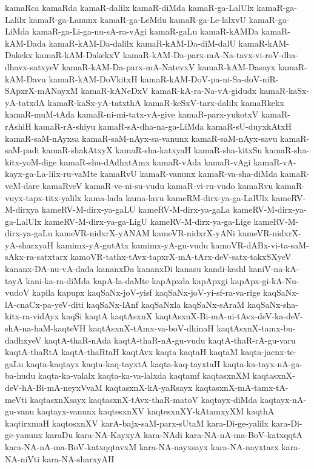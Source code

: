 {kamaRca
kamaRda
kamaR-dalilx
kamaR-diMda
kamaR-ga-LalUlx
kamaR-ga-Lalilx
kamaR-ga-Lanunx
kamaR-ga-LeMdu
kamaR-ga-Le-lalxvU
kamaR-ga-LiMda
kamaR-ga-Li-ga-nu-sA-ra-vAgi
kamaR-gaLu
kamaR-kAMDa
kamaR-kAM-Dada
kamaR-kAM-Da-dalilx
kamaR-kAM-Da-diM-dalU
kamaR-kAM-Dakekx
kamaR-kAM-DakekxV
kamaR-kAM-Da-parx-mA-Na-tavx-vi-roV-dha-dhavx-satxyeV
kamaR-kAM-Da-parx-mA-NatevxV
kamaR-kAM-Dasayx
kamaR-kAM-Davu
kamaR-kAM-DoVkitxH
kamaR-kAM-DoV-pa-ni-Sa-doV-niR-SApxrX-mANayxM
kamaR-kANeDxV
kamaR-kA-ra-Na-vA-gidudx
kamaR-kaSx-yA-tatxdA
kamaR-kaSx-yA-tatxthA
kamaR-keSxV-tarx-dalilx
kamaRkekx
kamaR-muM-tAda
kamaR-ni-mi-tatx-vA-give
kamaR-parx-yukotxV
kamaR-rAshiH
kamaR-rA-shiyu
kamaR-sA-dha-na-ga-LiMda
kamaR-sU-duyxkAtxH
kamaR-saM-nAyxsa
kamaR-saM-nAyx-sa-vanunx
kamaR-saM-nAyx-savu
kamaR-saM-padi
kamaR-shakAtxyX
kamaR-sha-katxyaH
kamaR-sha-kitxSu
kamaR-sha-kitx-yoM-dige
kamaR-shu-dAdhxtAmx
kamaR-vAda
kamaR-vAgi
kamaR-vA-kayx-ga-La-lilx-ru-vaMte
kamaRvU
kamaR-vanunx
kamaR-va-sha-diMda
kamaR-veM-dare
kamaRveV
kamaR-ve-ni-su-vudu
kamaR-vi-ru-vudo
kamaRvu
kamaR-vuyx-tapx-titx-yalilx
kama-lada
kama-lavu
kameRM-dirx-ya-ga-LalUlx
kameRV-M-dirxya
kameRV-M-dirx-ya-gaLU
kameRV-M-dirx-ya-gaLa
kameRV-M-dirx-ya-ga-LalUlx
kameRV-M-dirx-ya-ga-LigU
kameRV-M-dirx-ya-ga-Lige
kameRV-M-dirx-ya-gaLu
kameVR-nidxrX-yANAM
kameVR-nidxrX-yANi
kameVR-nidxrX-yA-sharxyaH
kamimx-yA-gutAtx
kamimx-yA-gu-vudu
kamoVR-dABx-vi-ta-saM-sAkx-ra-satxtarx
kamoVR-tathx-tAvx-tapxrX-mA-tArx-deV-satx-takxSXyeV
kananx-DA-nu-vA-dada
kananxDa
kananxDi
kanasu
kandi-keshl
kaniV-na-kA-tayA
kani-ka-ra-diMda
kapA-la-daMte
kapApxda
kapApxgi
kapApx-gi-kA-Nu-vudoV
kapila
kapupx
kaqSaNx-joV-yisf
kaqSaNx-joV-yi-sf-ra-va-rige
kaqSaNx-lA-cnaCx-pa-yeV-diti
kaqSaNx-lAnf
kaqSaNxla
kaqSaNx-sAraM
kaqSaNx-sha-kitx-ra-vidAyx
kaqSi
kaqtA
kaqtAsxnX
kaqtAsxnX-Bi-mA-ni-tAvx-deV-ka-deV-shA-na-haM-kaqteVH
kaqtAsxnX-tAmx-va-boV-dhinaH
kaqtAsxnX-tamx-bu-dadhxyeV
kaqtA-thaR-nAda
kaqtA-thaR-nA-gu-vudu
kaqtA-thaR-rA-gu-varu
kaqtA-thaRtA
kaqtA-thaRtaH
kaqtAvx
kaqta
kaqtaH
kaqtaM
kaqta-jacnx-te-gaLu
kaqta-kaqtayx
kaqta-kaq-tayxtA
kaqta-kaq-tayxtaH
kaqta-ka-tayx-nA-ga-ba-hudu
kaqta-ka-valalx
kaqta-ka-va-lalxda
kaqtamf
kaqtasxnXM
kaqtasxnX-deV-hA-Bi-mA-neyxVvaM
kaqtasxnX-kA-yaRsayx
kaqtasxnX-mA-tamx-tA-meVti
kaqtasxnXsayx
kaqtasxnX-tAvx-thaR-matoV
kaqtayx-diMda
kaqtayx-nA-gu-vanu
kaqtayx-vanunx
kaqtesxnXV
kaqtesxnXY-kAtamxyXM
kaqthA
kaqtirxmaH
kaqtosxnXV
karA-bajx-saM-parx-sUtaM
kara-Di-ge-yalilx
kara-Di-ge-yanunx
karaDu
kara-NA-KayxyA
kara-NAdi
kara-NA-nA-ma-BoV-katxqqtA
kara-NA-nA-ma-BoV-katxqqtavxM
kara-NA-nayxsayx
kara-NA-nayxtarx
kara-NA-niVti
kara-NA-sharxyAH
}
